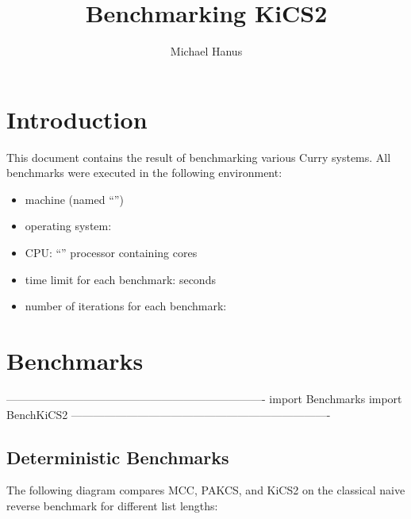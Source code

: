 \documentclass{article}
\begin{document}
\sloppy

\title{Benchmarking KiCS2}
\author{Michael Hanus}
\maketitle

\section{Introduction}

This document contains the result of benchmarking various
Curry systems.
%
All benchmarks were executed in the following environment:
\begin{itemize}
\item {} machine (named ``'')
\item operating system:  
\item CPU: ``'' processor containing
       cores
\item time limit for each benchmark:  seconds
\item number of iterations for each benchmark:
\end{itemize}
     
\section{Benchmarks}

\begin{curryprog}
----------------------------------------------------------------------
import Benchmarks
import BenchKiCS2
----------------------------------------------------------------------
\end{curryprog}

\subsection{Deterministic Benchmarks}

The following diagram compares MCC, PAKCS, and KiCS2
on the classical naive reverse benchmark for different list lengths:

\begin{center}
\end{center}
\end{document}
